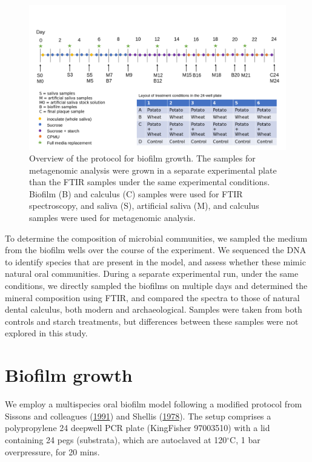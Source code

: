 \documentclass[
  letterpaper,
]{book}
\begin{document}
\begin{figure}

{\centering \includegraphics{figures/Exp_protocol.png}

}

\caption{\label{fig-protocol}Overview of the protocol for biofilm
growth. The samples for metagenomic analysis were grown in a separate
experimental plate than the FTIR samples under the same experimental
conditions. Biofilm (B) and calculus (C) samples were used for FTIR
spectroscopy, and saliva (S), artificial saliva (M), and calculus
samples were used for metagenomic analysis.}

\end{figure}

To determine the composition of microbial communities, we sampled the
medium from the biofilm wells over the course of the experiment. We
sequenced the DNA to identify species that are present in the model, and
assess whether these mimic natural oral communities. During a separate
experimental run, under the same conditions, we directly sampled the
biofilms on multiple days and determined the mineral composition using
FTIR, and compared the spectra to those of natural dental calculus, both
modern and archaeological. Samples were taken from both controls and
starch treatments, but differences between these samples were not
explored in this study.

\hypertarget{biofilm-growth}{%
\section{Biofilm growth}\label{biofilm-growth}}

We employ a multispecies oral biofilm model following a modified
protocol from Sissons and colleagues
(\protect\hyperlink{ref-sissonsMultistationPlaque1991}{1991}) and
Shellis (\protect\hyperlink{ref-shellisSyntheticSaliva1978}{1978}). The
setup comprises a polypropylene 24 deepwell PCR plate (KingFisher
97003510) with a lid containing 24 pegs (substrata), which are
autoclaved at 120\(^{\circ}\)C, 1 bar overpressure, for 20 mins.
\end{document}
